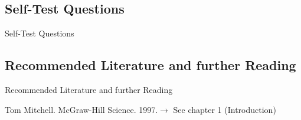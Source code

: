 \subsection{Self-Test Questions}

\begin{frame}{Self-Test Questions}{}

\end{frame}

\subsection{Recommended Literature and further Reading}

\begin{frame}{Recommended Literature and further Reading}{}
	\footnotesize
	\begin{thebibliography}{2}
			{Tom Mitchell. McGraw-Hill Science. 1997.}{$\rightarrow$ See chapter 1 (Introduction)}
	\end{thebibliography}
\end{frame}


\makethanks


%
%
%	


